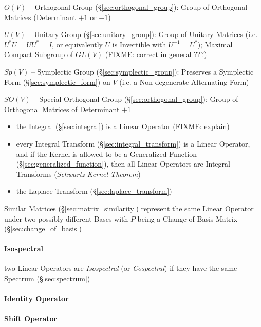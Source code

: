$O(V)$ -- Orthogonal Group (\S\ref{sec:orthogonal_group}): Group of Orthogonal
Matrices (Determinant $+1$ or $-1$)

$U(V)$ -- Unitary Group (\S\ref{sec:unitary_group}): Group of Unitary Matrices
(i.e. $U^*U = UU^* = I$, or equivalently $U$ is Invertible with $U^{-1} =
U^*$); Maximal Compact Subgroup of $GL(V)$ (FIXME: correct in general ???)

$Sp(V)$ -- Symplectic Group (\S\ref{sec:symplectic_group}): Preserves a
Symplectic Form (\S\ref{sec:symplectic_form}) on $V$ (i.e. a Non-degenerate
Alternating Form)

$SO(V)$ -- Special Orthogonal Group (\S\ref{sec:orthogonal_group}): Group of
Orthogonal Matrices of Determinant $+1$

\begin{itemize}
  \item the Integral (\S\ref{sec:integral}) is a Linear Operator (FIXME:
    explain)
  \item every Integral Transform (\S\ref{sec:integral_transform}) is a Linear
    Operator, and if the Kernel is allowed to be a Generalized Function
    (\S\ref{sec:generalized_function}), then all Linear Operators are Integral
    Transforms (\emph{Schwartz Kernel Theorem})
  \item the Laplace Transform (\S\ref{sec:laplace_transform})
\end{itemize}

Similar Matrices (\S\ref{sec:matrix_similarity}) represent the same Linear
Operator under two possibly different Bases with $P$ being a Change of Basis
Matrix (\S\ref{sec:change_of_basis})



\paragraph{Isospectral}\label{sec:isospectral}\hfill

two Linear Operators are \emph{Isospectral} (or \emph{Cospectral}) if they have
the same Spectrum (\S\ref{sec:spectrum})



\paragraph{Identity Operator}\label{sec:identity_operator}\hfill

\paragraph{Shift Operator}\label{sec:shift_operator}\hfill

